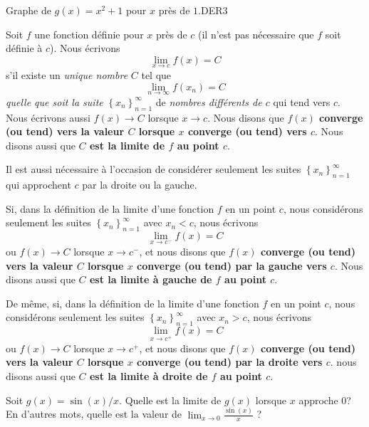 {
{Graphe de $g(x) = x^2 + 1$ pour $x$ près de $1$.}{DER3}

\begin{defn} 
Soit $f$ une fonction définie pour $x$ près de $c$ (il n'est pas
nécessaire que $f$ soit définie à $c$).  Nous écrivons
\[
\lim_{x\rightarrow c} f(x) = C
\]
s'il existe un {\em unique nombre} $C$ tel que
\[
\lim_{n\rightarrow \infty} f(x_n) = C
\]
{\em quelle que soit la suite}
$\displaystyle \left\{x_n\right\}_{n=1}^\infty$ de
{\em nombres différents de $c$} qui tend vers $c$.   Nous écrivons aussi
$f(x) \to C$ lorsque $x \to c$.  Nous disons que
{\bfseries $f(x)$ converge (ou tend) vers la valeur $C$
lorsque $x$ converge (ou tend) vers $c$}.  Nous disons aussi que
{\bfseries $C$ est la limite de $f$ au point $c$}.
\label{def1_conv}
\end{defn}

Il est aussi nécessaire à l'occasion de considérer seulement les suites
$\displaystyle \left\{x_n\right\}_{n=1}^\infty$ qui approchent $c$ par la
droite ou la gauche.

\begin{defn}
Si, dans la définition de la limite d'une fonction $f$ en un point
$c$, nous considérons seulement les suites
$\displaystyle \left\{x_n\right\}_{n=1}^\infty$ avec {\em $x_n < c$}, nous
écrivons
\[
\lim_{x\rightarrow c^-} f(x) = C
\]
ou $f(x) \to C$ lorsque $x \to c^-$,
et nous disons que {\bfseries $f(x)$ converge (ou tend) vers la valeur $C$
lorsque $x$ converge (ou tend) par la gauche vers $c$}.  Nous disons aussi
que {\bfseries $C$ est la limite à gauche de $f$ au point $c$}.

De même, si, dans la définition de la limite d'une fonction $f$ en un
point $c$, nous considérons seulement les suites
$\displaystyle \left\{x_n\right\}_{n=1}^\infty$ avec {\em $x_n > c$}, nous
écrivons
\[
\lim_{x\rightarrow c^+} f(x) = C
\]
ou $f(x) \to C$ lorsque $x \to c^+$,
et nous disons que {\bfseries $f(x)$ converge (ou tend) vers la valeur $C$
lorsque $x$ converge (ou tend) par la droite vers $c$}.  nous disons aussi que
{\bfseries $C$ est la limite à droite de $f$ au point $c$}.
\end{defn}

\begin{egg}
Soit $g(x) = \sin(x)/x$. Quelle est la limite de $g(x)$ lorsque $x$
approche $0$?  En d'autres mots, quelle est la valeur de
$\displaystyle \lim_{x\rightarrow 0} \frac{\sin(x)}{x}$ ?


\end{egg}}
